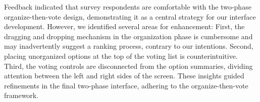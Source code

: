Feedback indicated that survey respondents are comfortable with the two-phase organize-then-vote design, demonstrating it as a central strategy for our interface development. However, we identified several areas for enhancement: First, the dragging and dropping mechanism in the organization phase is cumbersome and may inadvertently suggest a ranking process, contrary to our intentions. Second, placing unorganized options at the top of the voting list is counterintuitive. Third, the voting controls are disconnected from the option summaries, dividing attention between the left and right sides of the screen. These insights guided refinements in the final two-phase interface, adhering to the organize-then-vote framework.

